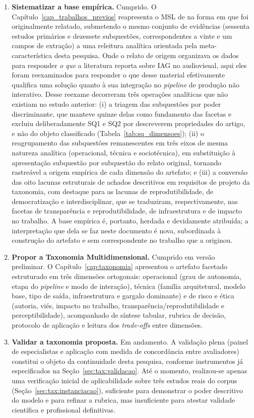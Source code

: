 \begin{enumerate}
    \item \textbf{Sistematizar a base empírica.} Cumprido. O Capítulo~\ref{cap_trabalhos_previos} reapresenta o MSL de \citet{RothAleo2026} na forma em que foi originalmente relatado, submetendo o mesmo conjunto de evidências (sessenta estudos primários e dezessete subquestões, correspondentes a vinte e um campos de extração) a uma releitura analítica orientada pela meta-característica desta pesquisa. Onde o relato de origem organizava os dados para responder \textit{o que} a literatura reporta sobre IAG no audiovisual, aqui eles foram reexaminados para responder o que desse material efetivamente qualifica uma solução quanto à sua integração no \textit{pipeline} de produção não interativo. Desse reexame decorreram três operações analíticas que não existiam no estudo anterior: (i) a triagem das subquestões por poder discriminante, que manteve quinze delas como fundamento das facetas e excluiu deliberadamente SQ1 e SQ2 por descreverem propriedades do artigo, e não do objeto classificado (Tabela~\ref{tab:sq_dimensoes}); (ii) o reagrupamento das subquestões remanescentes em três eixos de mesma natureza analítica (operacional, técnica e sociotécnica), em substituição à apresentação subquestão por subquestão do relato original, tornando rastreável a origem empírica de cada dimensão do artefato; e (iii) a conversão das oito lacunas estruturais de achados descritivos em requisitos de projeto da taxonomia, com destaque para as lacunas de reprodutibilidade, de democratização e interdisciplinar, que se traduziram, respectivamente, nas facetas de transparência e reprodutibilidade, de infraestrutura e de impacto no trabalho. A base empírica é, portanto, herdada e devidamente atribuída; a interpretação que dela se faz neste documento é nova, subordinada à construção do artefato e sem correspondente no trabalho que a originou.

    \item \textbf{Propor a Taxonomia Multidimensional.} Cumprido em versão preliminar. O Capítulo~\ref{cap:taxonomia} apresentou o artefato facetado estruturado em três dimensões ortogonais: operacional (grau de autonomia, etapa do \textit{pipeline} e modo de interação), técnica (família arquitetural, modelo base, tipo de saída, infraestrutura e gargalo dominante) e de risco e ética (autoria, viés, impacto no trabalho, transparência/reprodutibilidade e perceptibilidade), acompanhado de síntese tabular, rubrica de decisão, protocolo de aplicação e leitura dos \textit{trade-offs} entre dimensões.

    \item \textbf{Validar a taxonomia proposta.} Em andamento. A validação plena (painel de especialistas e aplicação com medida de concordância entre avaliadores) constitui o objeto da continuidade desta pesquisa, conforme instrumentos já especificados na Seção~\ref{sec:tax:validacao}. Até o momento, realizou-se apenas uma verificação inicial de aplicabilidade sobre três estudos reais do corpus (Seção~\ref{sec:tax:instanciacao}), suficiente para demonstrar o poder descritivo do modelo e para refinar a rubrica, mas insuficiente para atestar validade científica e profissional definitivas.
\end{enumerate}

